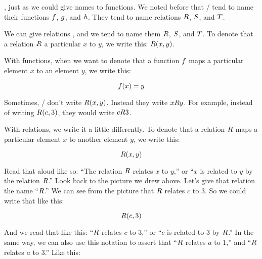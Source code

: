 \documentclass[../../../main.tex]{subfiles}
\begin{document}
, just as we could give names to functions. We noted before that \mathers/ tend to name their functions $f$, $g$, and $h$. They tend to name relations $R$, $S$, and $T$.

\begin{aside}
  \begin{notation}
    We can give relations , and we tend to name them $R$, $S$, and $T$. To denote that a relation $R$  a particular $x$ to $y$, we write this: $R(x, y)$. 
  \end{notation}
\end{aside}

With functions, when we want to denote that a function $f$ maps a particular element $x$ to an element $y$, we write this:

\begin{equation*}
  f(x) = y
\end{equation*}

\begin{aside}
  \begin{notation}
    Sometimes, \mathers/ don't write $R(x, y)$. Instead they write $xRy$. For example, instead of writing $R(c, 3)$, they would write $cR3$.
  \end{notation}
\end{aside}

With relations, we write it a little differently. To denote that a relation $R$ maps a particular element $x$ to another element $y$, we write this:

\begin{equation*}
  R(x, y)
\end{equation*}

Read that aloud like so: ``The relation $R$ relates $x$ to $y$,'' or ``$x$ is related to $y$ by the relation $R$.'' Look back to the picture we drew above. Let's give that relation the name ``$R$.'' We can see from the picture that $R$ relates $c$ to $3$. So we could write that like this:

\begin{equation*}
  R(c, 3)
\end{equation*}

And we read that like this: ``$R$ relates $c$ to $3$,'' or ``$c$ is related to $3$ by $R$.'' In the same way, we can also use this notation to assert that ``$R$ relates $a$ to $1$,'' and ``$R$ relates $a$ to $3$.'' Like this:
\end{document}
